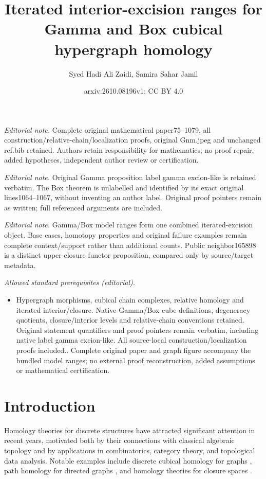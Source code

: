 \documentclass[10pt,a4paper]{amsart}
\title{Iterated interior-excision ranges for Gamma and Box cubical hypergraph homology}
\author{Syed Hadi Ali Zaidi, Samira Sahar Jamil}
\date{arxiv:2610.08196v1; CC BY 4.0}
\begin{document}
\maketitle
\noindent\textit{Editorial note.} Complete original mathematical paper75--1079, all construction/relative-chain/localization proofs, original Gnm.jpeg and unchanged ref.bib retained. Authors retain responsibility for mathematics; no proof repair, added hypotheses, independent author review or certification.\par\medskip
\noindent\textit{Editorial note.} Original Gamma proposition label gamma excion-like is retained verbatim. The Box theorem is unlabelled and identified by its exact original lines1064--1067, without inventing an author label. Original proof pointers remain as written; full referenced arguments are included.\par\medskip
\noindent\textit{Editorial note.} Gamma/Box model ranges form one combined iterated-excision object. Base cases, homotopy properties and original failure examples remain complete context/support rather than additional counts. Public neighbor165898 is a distinct upper-closure functor proposition, compared only by source/target metadata.\par\medskip
\noindent\textit{Allowed standard prerequisites (editorial).}\begin{itemize}
\item Hypergraph morphisms, cubical chain complexes, relative homology and iterated interior/closure. Native Gamma/Box cube definitions, degeneracy quotients, closure/interior levels and relative-chain conventions retained. Original statement quantifiers and proof pointers remain verbatim, including native label gamma excion-like. All source-local construction/localization proofs included.. Complete original paper and graph figure accompany the bundled model ranges; no external proof reconstruction, added assumptions or mathematical certification.
\end{itemize}\medskip
\section{Introduction}
Homology theories for discrete structures have attracted significant attention in recent years, motivated both by their connections with classical algebraic topology and by applications in combinatorics, category theory, and topological data analysis. Notable examples include discrete cubical homology for graphs \cite{HG_Barcelo19}, path homology for directed graphs \cite{HG_Grig18}, and homology theories for closure spaces \cite{HG_bubenik21, HG_bubenik22}.
\end{document}
